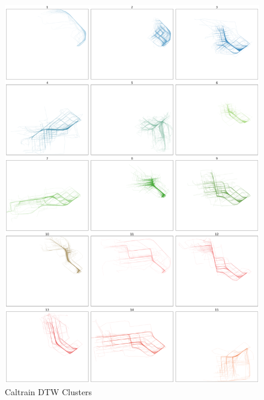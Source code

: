\documentclass[a4paper, 12pt]{article}
\begin{document}
\begin{figure}[htbp!]
    \centering
    \includegraphics[width=1\textwidth]{Caltrain DTW.png}
    \caption{Caltrain DTW Clusters}
    \label{fig40}
\end{figure}
\end{document}

